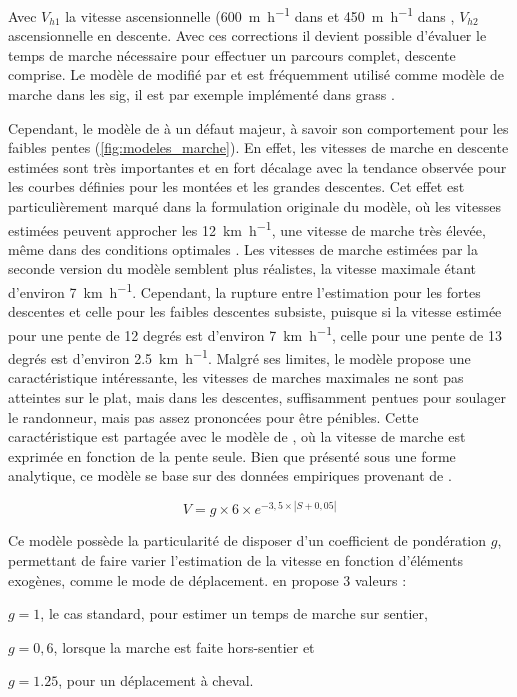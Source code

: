 Avec \(V_{h1}\) la vitesse ascensionnelle (\SI{600}{\meter\per\hour}
dans \textcite{Langmuir1984} et \SI{450}{\meter\per\hour} dans
\textcite{Langmuir2013}, \(V_{h2}\) ascensionnelle en descente. Avec
ces corrections il devient possible d'évaluer le temps de marche
nécessaire pour effectuer un parcours complet, descente comprise. Le
modèle de \textcite{Naismith1892} modifié par \textcite{Aitken1977} et
\textcite{Langmuir1984} est fréquemment utilisé comme modèle de marche
dans les \ac{sig}, il est par exemple implémenté dans grass
\autocite{GDT2020}.

Cependant, le modèle de  à un défaut majeur, à
savoir son comportement pour les faibles pentes
(\autoref{fig:modeles_marche}). En effet, les vitesses de marche en
descente estimées sont très importantes et en fort décalage avec la
tendance observée pour les courbes définies pour les montées et les
grandes descentes. Cet effet est particulièrement marqué dans la
formulation originale du modèle, où les vitesses estimées peuvent
approcher les \SI{12}{\kilo\meter\per\hour}, une vitesse de marche
très élevée, même dans des conditions optimales
\autocite{Kerouanton2020}. Les vitesses de marche estimées par la
seconde version du modèle \autocite{Langmuir2013} semblent plus
réalistes, la vitesse maximale étant d'environ
\SI{7}{\kilo\meter\per\hour}. Cependant, la rupture entre l'estimation
pour les fortes descentes et celle pour les faibles descentes
subsiste, puisque si la vitesse estimée pour une pente de 12 degrés
est d'environ \SI{7}{\kilo\meter\per\hour}, celle pour une pente de 13
degrés est d'environ \SI{2,5}{\kilo\meter\per\hour}. Malgré ses
limites, le modèle  propose une caractéristique
intéressante, les vitesses de marches maximales ne sont pas atteintes
sur le plat, mais dans les descentes, suffisamment pentues pour
soulager le randonneur, mais pas assez prononcées pour être pénibles.
Cette caractéristique est partagée avec le modèle de
\textcite{Tobler1993}, où la vitesse de marche est exprimée en
fonction de la pente seule. Bien que présenté sous une forme
analytique, ce modèle se base sur des données empiriques provenant de
\textcite{Imhof1950}.

\begin{equation}
  \label{eq:marche_tobler}
  V = g × 6 × e^{-3,5 × \left| S + 0,05 \right|}
\end{equation}

Ce modèle possède la particularité de disposer d'un coefficient de
pondération \(g\), permettant de faire varier l'estimation de la
vitesse en fonction d'éléments exogènes, comme le mode de
déplacement. \textcite{Tobler1993} en propose 3 valeurs :
%
\begin{enumerate*}[label=(\alph*)]
\item \(g = 1\), le cas standard, pour estimer un temps de marche sur
  sentier,
\item \(g = 0,6\), lorsque la marche est faite hors-sentier et
\item  \(g = 1.25\), pour un déplacement à cheval.
\end{enumerate*}

